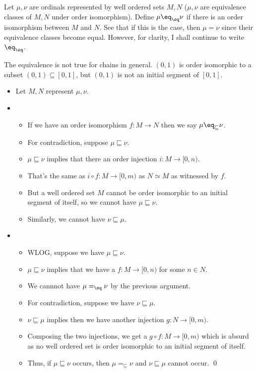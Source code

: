 \documentclass{article}
\newcommand{\sqlt}{\sqsubseteq}
\begin{document}
 Let $\mu, \nu$ are ordinals represented by well
ordered sets $M, N$ ($\mu, \nu$ are equivalence classes of $M, N$ under order
isomorphism). Define $\mu \eq_\sq \nu$ if there is an order isomorphism between
$M$ and $N$. See that if this is the case, then $\mu = \nu$ since their equivalence 
classes become equal. However, for clarity, I shall continue to write $\eq_\sq$.


The equivalence is not true for chains in general. $(0, 1)$ is order isomorphic to a subset $(0, 1) \subseteq [0, 1]$,
but $(0, 1)$ is not an initial segment of $[0, 1]$.


\start{Theorem: At most one of $\mu \sqlt \nu$, $\mu \sqgt \nu$, or $\mu \eq_{\sqlt} \nu$ hold}
\begin{itemize}
\item Let $M, N$ represent $\mu, \nu$.
\item 
    \begin{itemize}
            \item If we have an order isomorphism $f: M \rightarrow N$ then we say  $\mu \eq_{\sqlt} \nu$.
            \item For contradiction, suppose $\mu \sqlt \nu$.
            \item $\mu \sqlt \nu$ implies that there an order injection $i: M \rightarrow [0, n)$.
            \item That's the same as $i \circ f: M \rightarrow [0, m)$ as $N \simeq M$ as witnessed by $f$.
            \item But a well ordered set $M$ cannot be order isomorphic to an initial segment of itself, so we cannot have $\mu \sqlt \nu$.
            \item Similarly, we cannot have $\nu \sqlt \mu$.
        \end{itemize}
\item 
    \begin{itemize}
            \item WLOG, suppose we have $\mu \sqlt \nu$.
            \item $\mu \sqlt \nu$ implies that we have a $f: M \rightarrow [0, n)$ for some $n \in N$.
            \item We cannnot have $\mu =_\sq \nu$ by the previous argument.
            \item For contradiction, suppose we have $\nu \sqlt \mu$.
            \item $\nu \sqlt \mu$ implies then we have another injection $g: N \rightarrow [0, m)$.
            \item Composing the two injections, we get a $g \circ f: M
                \rightarrow [0, m)$ which is absurd as no well ordered set is
                order isomorphic to an initial segment of itself.
            \item Thus, if $\mu \sqlt \nu$  occurs, then $\mu =_\sqlt \nu$ and $\nu \sqlt \mu$ cannot occur. \qed
        \end{itemize}
\end{itemize}
\end{document}
